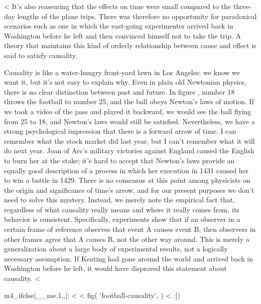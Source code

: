   <%
It's also reassuring that the effects on time were
small compared to the three-day lengths of the plane trips. There was therefore no
opportunity for paradoxical scenarios such as one in which the east-going experimenter arrived
back in Washington before he left and then convinced himself not to take the trip.
A theory that maintains this kind of orderly relationship between cause and effect is said to satisfy causality.

Causality is like a water-hungry front-yard lawn in Los Angeles: we know we want it, but it's not easy to explain why.
Even in plain old Newtonian physics, there is no clear distinction between past and future. In figure , number 18
throws the football to number 25, and the ball obeys Newton's laws of motion. If we took a video of the pass and played
it backward, we would see the ball flying from 25 to 18, and Newton's laws would still be satisfied. Nevertheless, we have a strong
psychological impression that there is a forward arrow of time. I can remember what the stock market did last year, but I can't
remember what it will do next year. Joan of Arc's military victories against England caused the English to burn her at the stake;
it's hard to accept that Newton's laws provide an equally good description of a process in which her execution in 1431 caused her to win a battle in 1429.
There is no consensus at this point among physicists on the origin and significance of time's arrow, and for our present purposes
we don't need to solve this mystery. Instead, we merely note the empirical fact that, regardless of what causality really means and
where it really comes from, its behavior is consistent. Specifically, experiments show that if an observer
in a certain frame of reference observes that event A causes event B, then observers in other frames agree
that A causes B, not the other way around. This is merely a generalization about a large body of experimental results, not a logically necessary
assumption. If Keating had gone around the world and arrived back in Washington before he left, it would have disproved
this statement about causality.
  <%

m4_ifelse(__me,1,,[: %
<%
<%
  fig(
    'football-causality',
  )
<%
:]) %

